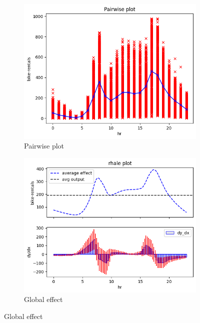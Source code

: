 \documentclass[sigconf, nonacm]{acmart}
\begin{document}
\begin{figure}
  \centering
  \begin{subfigure}[t]{0.24\textwidth}
  \centering
  \includegraphics[width=\linewidth]{figures/running_example/01_bike_sharing_dataset_pairwise_plot.png}
  \caption{Pairwise plot}
  \label{subfig:pairwise}
  \end{subfigure}
  \begin{subfigure}[t]{0.24\textwidth}
  \centering
  \includegraphics[width=\linewidth]{figures/running_example/01_bike_sharing_dataset_23_1.png}
  \caption{Global effect}
  \label{subfig:global}
  \end{subfigure}

\end{figure}
\end{document}
